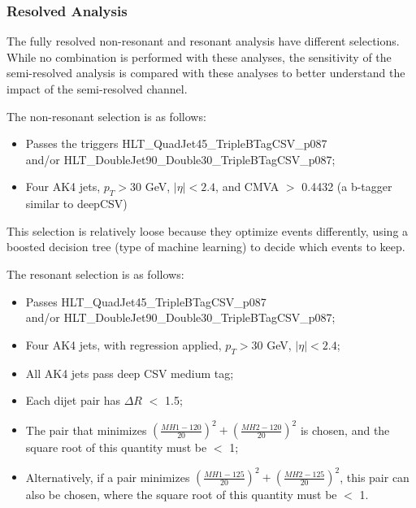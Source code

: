 \subsubsection{Resolved Analysis\label{sss:resolve}}
The fully resolved non-resonant and resonant analysis have different selections. While no combination is performed with these analyses, the sensitivity of the semi-resolved analysis is compared with these analyses to better understand the impact of the semi-resolved channel.

The non-resonant selection is as follows:
\begin{itemize}
\item Passes the triggers HLT\_QuadJet45\_TripleBTagCSV\_p087 \\and/or HLT\_DoubleJet90\_Double30\_TripleBTagCSV\_p087;
\item Four AK4 jets, $p_{T} > 30$ GeV, $|\eta| < 2.4$, and CMVA $>$ 0.4432 (a b-tagger similar to deepCSV)
\end{itemize}

This selection is relatively loose because they optimize events differently, using a boosted decision tree (type of machine learning) to decide which events to keep.

The resonant selection is as follows:
\begin{itemize}
\item Passes HLT\_QuadJet45\_TripleBTagCSV\_p087 \\
and/or HLT\_DoubleJet90\_Double30\_TripleBTagCSV\_p087;
\item Four AK4 jets, with regression applied, $p_{T} > 30$ GeV, $|\eta| < 2.4$;
\item All AK4 jets pass deep CSV medium tag;
\item Each dijet pair has $\Delta R$ $<$ 1.5;
\item The pair that minimizes $(\frac{MH1 - 120}{20})^{2} + (\frac{MH2 - 120}{20})^{2}$ is chosen, and the square root of this quantity must be $<$ 1;
\item Alternatively, if a pair minimizes $(\frac{MH1 - 125}{20})^{2} + (\frac{MH2 - 125}{20})^{2}$, this pair can also be chosen, where the square root of this quantity must be $<$ 1.
\end{itemize}


